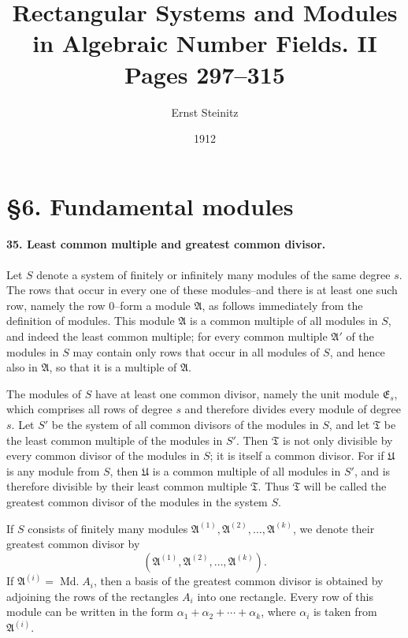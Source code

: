 \documentclass[11pt]{article}
\title{Rectangular Systems and Modules in Algebraic Number Fields. II\\\large Pages 297--315}
\author{Ernst Steinitz}
\date{1912}
\newcommand{\Md}{\operatorname{Md.}}
\begin{document}
\maketitle

\section*{\S 6. Fundamental modules}

\paragraph{35. Least common multiple and greatest common divisor.}
Let $S$ denote a system of finitely or infinitely many modules of the same degree $s$. The rows that occur in every one of these modules--and there is at least one such row, namely the row $0$--form a module $\mathfrak A$, as follows immediately from the definition of modules. This module $\mathfrak A$ is a common multiple of all modules in $S$, and indeed the least common multiple; for every common multiple $\mathfrak A'$ of the modules in $S$ may contain only rows that occur in all modules of $S$, and hence also in $\mathfrak A$, so that it is a multiple of $\mathfrak A$.

The modules of $S$ have at least one common divisor, namely the unit module $\mathfrak E_s$, which comprises all rows of degree $s$ and therefore divides every module of degree $s$. Let $S'$ be the system of all common divisors of the modules in $S$, and let $\mathfrak T$ be the least common multiple of the modules in $S'$. Then $\mathfrak T$ is not only divisible by every common divisor of the modules in $S$; it is itself a common divisor. For if $\mathfrak U$ is any module from $S$, then $\mathfrak U$ is a common multiple of all modules in $S'$, and is therefore divisible by their least common multiple $\mathfrak T$. Thus $\mathfrak T$ will be called the greatest common divisor of the modules in the system $S$.

If $S$ consists of finitely many modules $\mathfrak A^{(1)},\mathfrak A^{(2)},\ldots,\mathfrak A^{(k)}$, we denote their greatest common divisor by
\[
(\mathfrak A^{(1)},\mathfrak A^{(2)},\ldots,\mathfrak A^{(k)}).
\]
If $\mathfrak A^{(i)}=\Md A_i$, then a basis of the greatest common divisor is obtained by adjoining the rows of the rectangles $A_i$ into one rectangle. Every row of this module can be written in the form $\alpha_1+
\alpha_2+
\cdots+
\alpha_k$, where $\alpha_i$ is taken from $\mathfrak A^{(i)}$.
\end{document}
